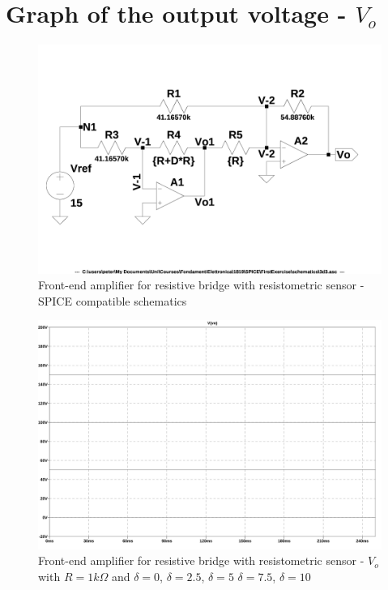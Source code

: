 \documentclass[10pt,a4paper]{book}
\begin{document}
\section{Graph of the output voltage - $V_o$}

\begin{figure}[H]
  \centering
  \includegraphics[width=12cm]{schematics/3d3.jpg}
  \caption{Front-end amplifier for resistive bridge with resistometric sensor - SPICE compatible schematics}
  \label{3d3schematics}
\end{figure}



\begin{figure}[H]
  \centering
  \includegraphics[width=14cm]{graph/3d3.jpg}
  \caption{Front-end amplifier for resistive bridge with resistometric sensor - $V_o$ with $R = 1k\Omega$ and $\delta = 0$, $\delta = 2.5$, $\delta = 5$ $\delta = 7.5$, $\delta = 10$}
  \label{3d3graph}
\end{figure}
\end{document}
